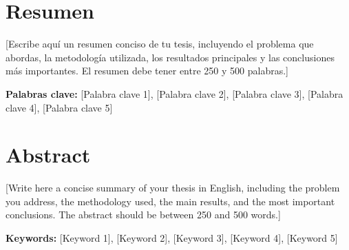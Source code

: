 \chapter*{Resumen}

[Escribe aquí un resumen conciso de tu tesis, incluyendo el problema que abordas, la metodología utilizada, los resultados principales y las conclusiones más importantes. El resumen debe tener entre 250 y 500 palabras.]

\vspace{1cm}

\textbf{Palabras clave:} [Palabra clave 1], [Palabra clave 2], [Palabra clave 3], [Palabra clave 4], [Palabra clave 5]

\chapter*{Abstract}

[Write here a concise summary of your thesis in English, including the problem you address, the methodology used, the main results, and the most important conclusions. The abstract should be between 250 and 500 words.]

\vspace{1cm}

\textbf{Keywords:} [Keyword 1], [Keyword 2], [Keyword 3], [Keyword 4], [Keyword 5]